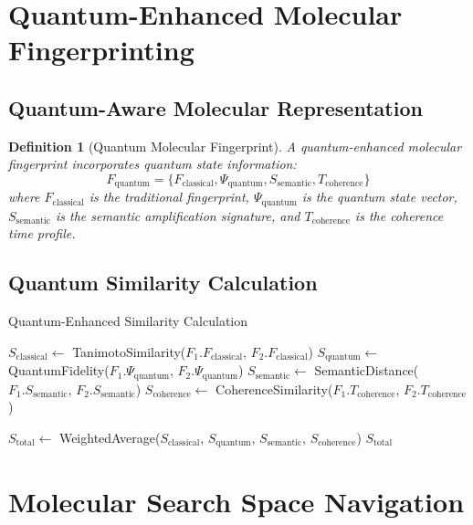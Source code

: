 \documentclass[12pt,a4paper]{article}
\newtheorem{definition}[theorem]{Definition}
\begin{document}
\section{Quantum-Enhanced Molecular Fingerprinting}

\subsection{Quantum-Aware Molecular Representation}

\begin{definition}[Quantum Molecular Fingerprint]
A quantum-enhanced molecular fingerprint incorporates quantum state information:
\begin{equation}
F_{\text{quantum}} = \{F_{\text{classical}}, \Psi_{\text{quantum}}, S_{\text{semantic}}, T_{\text{coherence}}\}
\end{equation}
where $F_{\text{classical}}$ is the traditional fingerprint, $\Psi_{\text{quantum}}$ is the quantum state vector, $S_{\text{semantic}}$ is the semantic amplification signature, and $T_{\text{coherence}}$ is the coherence time profile.
\end{definition}

\subsection{Quantum Similarity Calculation}

\begin{algorithm}[H]
\caption{Quantum-Enhanced Similarity Calculation}
\begin{algorithmic}[1]
    \State $S_{\text{classical}} \gets$ TanimotoSimilarity($F_1.F_{\text{classical}}$, $F_2.F_{\text{classical}}$)
    \State $S_{\text{quantum}} \gets$ QuantumFidelity($F_1.\Psi_{\text{quantum}}$, $F_2.\Psi_{\text{quantum}}$)
    \State $S_{\text{semantic}} \gets$ SemanticDistance($F_1.S_{\text{semantic}}$, $F_2.S_{\text{semantic}}$)
    \State $S_{\text{coherence}} \gets$ CoherenceSimilarity($F_1.T_{\text{coherence}}$, $F_2.T_{\text{coherence}}$)

    \State $S_{\text{total}} \gets$ WeightedAverage($S_{\text{classical}}$, $S_{\text{quantum}}$, $S_{\text{semantic}}$, $S_{\text{coherence}}$)
    \State \Return $S_{\text{total}}$
\EndProcedure
\end{algorithmic}
\end{algorithm}

\section{Molecular Search Space Navigation}
\end{document}
